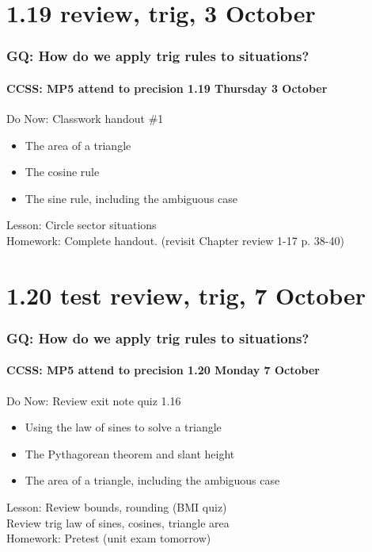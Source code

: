 \documentclass{beamer}
\begin{document}
  \section{1.19 review, trig, 3 October}
  \frame
  {
    \frametitle{GQ: How do we apply trig rules to situations?}
    \framesubtitle{CCSS: MP5 attend to precision \hfill \alert{1.19 Thursday 3 October}}

    \begin{block}{Do Now: Classwork handout \#1}
      \begin{itemize}
          \item The area of a triangle
          \item The cosine rule 
          \item The sine rule, including the ambiguous case
       \end{itemize}
      \end{block}
    Lesson: Circle sector situations\\ \smallskip
    Homework: Complete handout. (revisit Chapter review 1-17 p. 38-40)
  }

  \section{1.20 test review, trig, 7 October}
  \frame
  {
    \frametitle{GQ: How do we apply trig rules to situations?}
    \framesubtitle{CCSS: MP5 attend to precision \hfill \alert{1.20 Monday 7 October}}

    \begin{block}{Do Now: Review exit note quiz 1.16}
      \begin{itemize}
          \item Using the law of sines to solve a triangle
          \item The Pythagorean theorem and slant height 
          \item The area of a triangle, including the ambiguous case
       \end{itemize}
      \end{block}
    Lesson: Review bounds, rounding (BMI quiz)\\ \smallskip
    \hspace{2cm} Review trig law of sines, cosines, triangle area\\ \smallskip
    Homework: Pretest \alert{(unit exam tomorrow)}
  }
\end{document}
